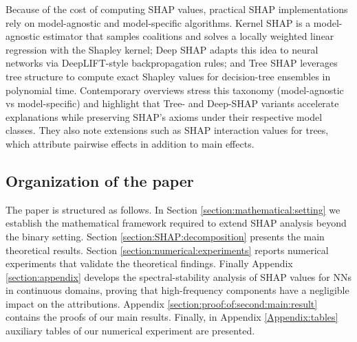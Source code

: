 \documentclass[letterpaper,11pt]{article}
\numberwithin{equation}{section}
\numberwithin{equation}{section}
\begin{document}
Because of the cost of computing SHAP values, practical SHAP implementations rely on model-agnostic and model-specific algorithms. Kernel SHAP \cite{lundberg2017unified} is a model-agnostic estimator that samples coalitions and solves a locally weighted linear regression with the Shapley kernel; Deep SHAP adapts this idea to neural networks via DeepLIFT-style backpropagation rules; and Tree SHAP leverages tree structure to compute exact Shapley values for decision-tree ensembles in polynomial time. Contemporary overviews stress this taxonomy (model-agnostic vs model-specific) and highlight that Tree- and Deep-SHAP variants accelerate explanations while preserving SHAP's axioms under their respective model classes. They also note extensions such as SHAP interaction values for trees, which attribute pairwise effects in addition to main effects.

\subsection{Organization of the paper}
The paper is structured as follows. In Section \ref{section:mathematical:setting} we establish the mathematical framework required to extend SHAP analysis beyond the binary setting. Section \ref{section:SHAP:decomposition} presents the main theoretical results. Section \ref{section:numerical:experiments} reports numerical experiments that validate the theoretical findings. Finally Appendix \ref{section:appendix} develops the spectral-stability analysis of SHAP values for NNs in continuous domains, proving that high-frequency components have a negligible impact on the attributions. Appendix \ref{section:proof:of:second:main:result} contains the proofs of our main results. Finally, in Appendix \ref{Appendix:tables} auxiliary tables of our numerical experiment are presented.
\end{document}
